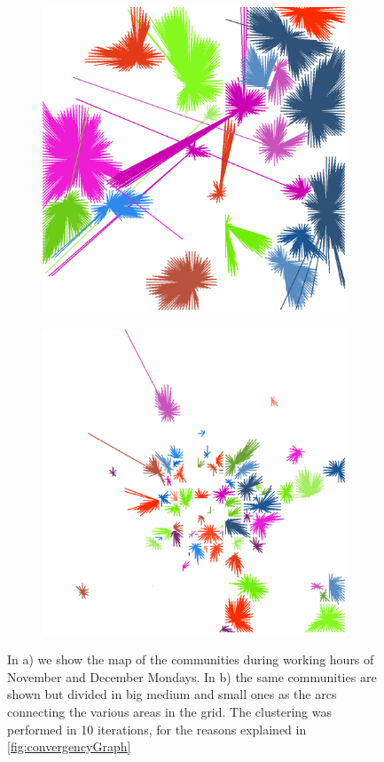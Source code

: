 \documentclass[12pt,a4paper]{article}
\begin{document}
\begin{figure}[H]
\begin{subfigure}[b]{0.3\textwidth}
\includegraphics[width=\textwidth]{weekDef/edges-1Mon-mid.png}
\end{subfigure}
\begin{subfigure}[b]{0.3\textwidth}
\includegraphics[width=\textwidth]{weekDef/edges-1Mon-small.png}
\end{subfigure}
\label{fig:mondayworking}
\caption{In a) we show the map of the communities during working hours of November and December Mondays. 
In b) the same communities are shown but divided in big medium and small ones as the arcs connecting the various areas in the grid.
The clustering was performed in 10 iterations, for the reasons explained in \ref{fig:convergencyGraph}}
\end{figure}
\end{document}
